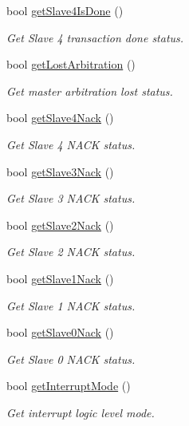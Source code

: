 \begin{DoxyCompactItemize}
bool \mbox{\hyperlink{classMPU6050_a105aefe645e7021f9ba4397e9df4114c}{get\+Slave4\+Is\+Done}} ()
\begin{DoxyCompactList}\small\item\em Get Slave 4 transaction done status. \end{DoxyCompactList}\item 
bool \mbox{\hyperlink{classMPU6050_acd775c72f85dabfc6f8fba43da096c6d}{get\+Lost\+Arbitration}} ()
\begin{DoxyCompactList}\small\item\em Get master arbitration lost status. \end{DoxyCompactList}\item 
bool \mbox{\hyperlink{classMPU6050_ae9882b425cbdced4de325b608d896e10}{get\+Slave4\+Nack}} ()
\begin{DoxyCompactList}\small\item\em Get Slave 4 N\+A\+CK status. \end{DoxyCompactList}\item 
bool \mbox{\hyperlink{classMPU6050_a55f24d2f2b13d6e28a7c8b6bf2913520}{get\+Slave3\+Nack}} ()
\begin{DoxyCompactList}\small\item\em Get Slave 3 N\+A\+CK status. \end{DoxyCompactList}\item 
bool \mbox{\hyperlink{classMPU6050_af4b5101dab501d6df2e0cae909120771}{get\+Slave2\+Nack}} ()
\begin{DoxyCompactList}\small\item\em Get Slave 2 N\+A\+CK status. \end{DoxyCompactList}\item 
bool \mbox{\hyperlink{classMPU6050_a65cc9d75ff347b146414685fb83fa451}{get\+Slave1\+Nack}} ()
\begin{DoxyCompactList}\small\item\em Get Slave 1 N\+A\+CK status. \end{DoxyCompactList}\item 
bool \mbox{\hyperlink{classMPU6050_a74511edfcada3fb21c3327a0c846c72a}{get\+Slave0\+Nack}} ()
\begin{DoxyCompactList}\small\item\em Get Slave 0 N\+A\+CK status. \end{DoxyCompactList}\item 
bool \mbox{\hyperlink{classMPU6050_a58da1dfb39eb34e3a09a9b0bf4d87f29}{get\+Interrupt\+Mode}} ()
\begin{DoxyCompactList}\small\item\em Get interrupt logic level mode. \end{DoxyCompactList}\item 

\end{DoxyCompactItemize}
